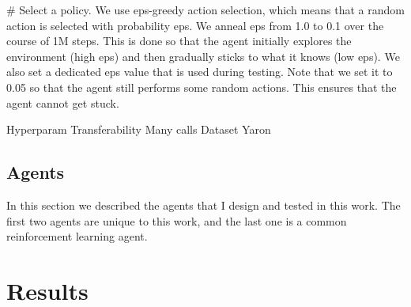 \documentclass{article}
\begin{document}
    # Select a policy. We use eps-greedy action selection, which means that a random action is selected with probability eps. We anneal eps from 1.0 to 0.1 over the course of 1M steps. This is done so that the agent initially explores the environment (high eps) and then gradually sticks to what it knows (low eps). We also set a dedicated eps value that is used during testing. Note that we set it to 0.05 so that the agent still performs some random actions. This ensures that the agent cannot get stuck.



Hyperparam
Transferability 
Many calls
Dataset 
Yaron

\subsection{Agents}
In this section we described the agents that I design and tested in this work. The first two agents are unique to this work, and the last one is a common reinforcement learning agent.

\section{Results}
\end{document}
